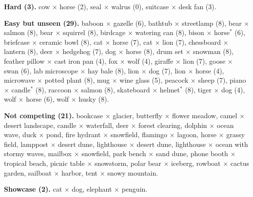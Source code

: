 \noindent\textbf{Hard (3).} cow $\times$ horse (2), seal $\times$ walrus (0), suitcase $\times$ desk fan (3).\par\smallskip
\noindent\textbf{Easy but unseen (29).} baboon $\times$ gazelle (6), bathtub $\times$ streetlamp (8), bear $\times$ salmon (8), bear $\times$ squirrel (8), birdcage $\times$ watering can (8), bison $\times$ horse$^*$ (6), briefcase $\times$ ceramic bowl (8), cat $\times$ horse (7), cat $\times$ lion (7), chessboard $\times$ lantern (8), deer $\times$ hedgehog (7), dog $\times$ horse (8), drum set $\times$ snowman (8), feather pillow $\times$ cast iron pan (4), fox $\times$ wolf (4), giraffe $\times$ lion (7), goose $\times$ swan (6), lab microscope $\times$ hay bale (8), lion $\times$ dog (7), lion $\times$ horse (4), microwave $\times$ potted plant (8), mug $\times$ wine glass (5), peacock $\times$ sheep (7), piano $\times$ candle$^*$ (8), raccoon $\times$ salmon (8), skateboard $\times$ helmet$^*$ (8), tiger $\times$ dog (4), wolf $\times$ horse (6), wolf $\times$ husky (8).\par\smallskip
\noindent\textbf{Not competing (21).} bookcase $\times$ glacier, butterfly $\times$ flower meadow, camel $\times$ desert landscape, candle $\times$ waterfall, deer $\times$ forest clearing, dolphin $\times$ ocean wave, duck $\times$ pond, fire hydrant $\times$ snowfield, flamingo $\times$ lagoon, horse $\times$ grassy field, lamppost $\times$ desert dune, lighthouse $\times$ desert dune, lighthouse $\times$ ocean with stormy waves, mailbox $\times$ snowfield, park bench $\times$ sand dune, phone booth $\times$ tropical beach, picnic table $\times$ snowstorm, polar bear $\times$ iceberg, rowboat $\times$ cactus garden, sailboat $\times$ harbor, tent $\times$ snowy mountain.\par\smallskip
\noindent\textbf{Showcase (2).} cat $\times$ dog, elephant $\times$ penguin.\par\smallskip
